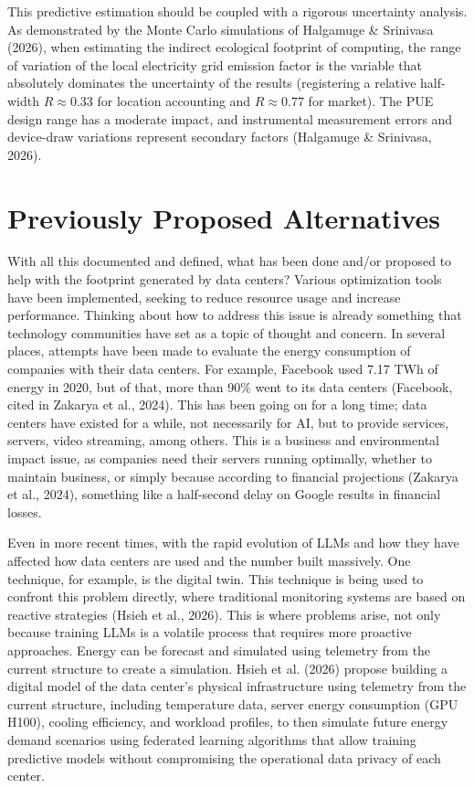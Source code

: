 \documentclass[conference]{IEEEtran}
\begin{document}
This predictive estimation should be coupled with a rigorous uncertainty analysis. As demonstrated by the Monte Carlo simulations of Halgamuge \& Srinivasa (2026), when estimating the indirect ecological footprint of computing, the range of variation of the local electricity grid emission factor is the variable that absolutely dominates the uncertainty of the results (registering a relative half-width $R \approx 0.33$ for location accounting and $R \approx 0.77$ for market). The PUE design range has a moderate impact, and instrumental measurement errors and device-draw variations represent secondary factors (Halgamuge \& Srinivasa, 2026).

\section{Previously Proposed Alternatives}

With all this documented and defined, what has been done and/or proposed to help with the footprint generated by data centers? Various optimization tools have been implemented, seeking to reduce resource usage and increase performance. Thinking about how to address this issue is already something that technology communities have set as a topic of thought and concern. In several places, attempts have been made to evaluate the energy consumption of companies with their data centers. For example, Facebook used 7.17 TWh of energy in 2020, but of that, more than 90\% went to its data centers (Facebook, cited in Zakarya et al., 2024). This has been going on for a long time; data centers have existed for a while, not necessarily for AI, but to provide services, servers, video streaming, among others. This is a business and environmental impact issue, as companies need their servers running optimally, whether to maintain business, or simply because according to financial projections (Zakarya et al., 2024), something like a half-second delay on Google results in financial losses.

Even in more recent times, with the rapid evolution of LLMs and how they have affected how data centers are used and the number built massively. One technique, for example, is the digital twin. This technique is being used to confront this problem directly, where traditional monitoring systems are based on reactive strategies (Hsieh et al., 2026). This is where problems arise, not only because training LLMs is a volatile process that requires more proactive approaches. Energy can be forecast and simulated using telemetry from the current structure to create a simulation. Hsieh et al. (2026) propose building a digital model of the data center's physical infrastructure using telemetry from the current structure, including temperature data, server energy consumption (GPU H100), cooling efficiency, and workload profiles, to then simulate future energy demand scenarios using federated learning algorithms that allow training predictive models without compromising the operational data privacy of each center.
\end{document}
